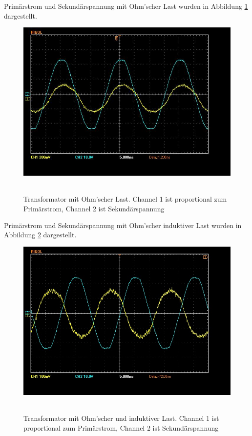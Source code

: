 \documentclass{article}
\begin{document}
Primärstrom und Sekundärspannung mit Ohm’scher Last wurden in Abbildung \ref{fig:task2} dargestellt.

\begin{figure}[H]
\caption{Transformator mit Ohm'scher Last. Channel 1 ist proportional zum Primärstrom, Channel 2 ist Sekundärspannung}
\label{fig:task2}
{\centering
\includegraphics[scale=0.4]{task2.jpg}
~
}
\end{figure}

Primärstrom und Sekundärspannung mit Ohm’scher induktiver Last wurden in Abbildung \ref{fig:task3} dargestellt.


\begin{figure}[H]
\caption{Transformator mit Ohm'scher und induktiver Last. Channel 1 ist proportional zum Primärstrom, Channel 2 ist Sekundärspannung}
\label{fig:task3}
{\centering
\includegraphics[scale=0.4]{task3.jpg}
~
}
\end{figure}
\end{document}
